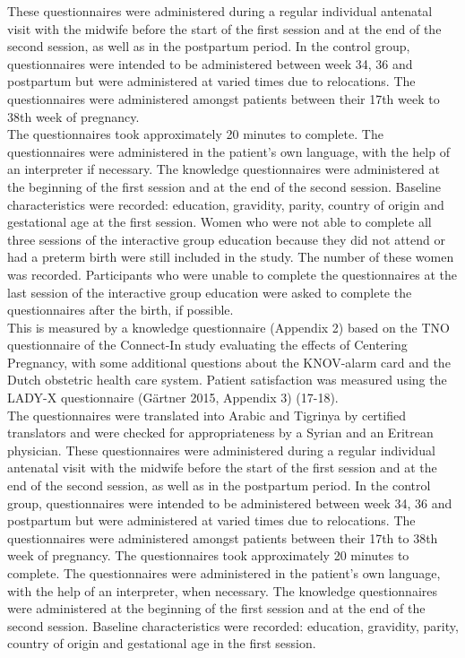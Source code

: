 \documentclass[12pt]{article}
\begin{document}
\noindent These questionnaires were administered during a regular individual antenatal visit with the midwife before the start of the first session and at the end of the second session, as well as in the postpartum period. In the control group, questionnaires were intended to be administered between week 34, 36 and postpartum but were administered at varied times due to relocations. The questionnaires were administered amongst patients between their 17th week to 38th week of pregnancy. \\

\noindent The questionnaires took approximately 20 minutes to complete. The questionnaires were administered in the patient's own language, with the help of an interpreter if necessary. The knowledge questionnaires were administered at the beginning of the first session and at the end of the second session. 
Baseline characteristics were recorded: education, gravidity, parity, country of origin and gestational age at the first session. Women who were not able to complete all three sessions of the interactive group education because they did not attend or had a preterm birth were still included in the study. The number of these women was recorded. Participants who were unable to complete the questionnaires at the last session of the interactive group education were asked to complete the questionnaires after the birth, if possible. \\

\noindent This is measured by a knowledge questionnaire (Appendix 2) based on the TNO questionnaire of the Connect-In study evaluating the effects of Centering Pregnancy, with some additional questions about the KNOV-alarm card and the Dutch obstetric health care system. Patient satisfaction was measured using the LADY-X questionnaire (Gärtner 2015, Appendix 3) (17-18). \\

\noindent The questionnaires were translated into Arabic and Tigrinya by certified translators and were checked for appropriateness by a Syrian and an Eritrean physician. These questionnaires were administered during a regular individual antenatal visit with the midwife before the start of the first session and at the end of the second session, as well as in the postpartum period. In the control group, questionnaires were intended to be administered between week 34, 36 and postpartum but were administered at varied times due to relocations. The questionnaires were administered amongst patients between their 17th to 38th week of pregnancy. The questionnaires took approximately 20 minutes to complete. The questionnaires were administered in the patient's own language, with the help of an interpreter, when necessary. The knowledge questionnaires were administered at the beginning of the first session and at the end of the second session. 
\noindent Baseline characteristics were recorded: education, gravidity, parity, country of origin and gestational age in the first session. \\
\end{document}
